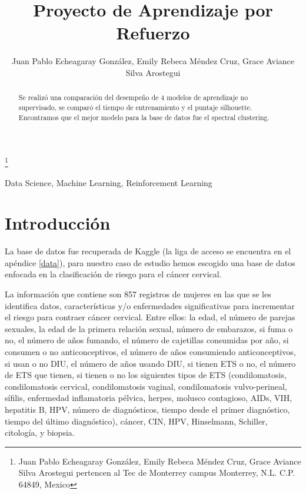 \documentclass[journal]{IEEEtran}
\title{\LARGE \bf Proyecto de Aprendizaje por Refuerzo}
\author{Juan Pablo Echeagaray González, Emily Rebeca Méndez Cruz, Grace Aviance Silva Arostegui}%
\begin{document}
    \thanks{Juan Pablo Echeagaray González, Emily Rebeca Méndez Cruz, Grace Aviance Silva Arostegui pertencen al Tec de Monterrey campus Monterrey, N.L. C.P. 64849, Mexico {\tt\small}}

    \maketitle

    \thispagestyle{empty}
    \pagestyle{empty}
    
    \begin{abstract}
        Se realizó una comparación del desempeño de 4 modelos de aprendizaje no supervisado, se comparó el tiempo de entrenamiento y el puntaje silhouette. Encontramos que el mejor modelo para la base de datos fue el spectral clustering.
    \end{abstract}

    \begin{IEEEkeywords} 
    Data Science, Machine Learning, Reinforcement Learning
    \end{IEEEkeywords}

    \section{Introducción} \label{introduction}

        La base de datos fue recuperada de Kaggle (la liga de acceso se encuentra en el apéndice \ref{data}), para nuestro caso de estudio hemos escogido una base de datos enfocada en la clasificación de riesgo para el cáncer cervical.

        La información que contiene son  857 registros de mujeres en las que se les identifica datos, características y/o enfermedades significativas para incrementar el riesgo para contraer cáncer cervical. Entre ellos: la edad, el número de parejas sexuales, la edad de la primera relación sexual, número de embarazos, si fuma o no, el número de años fumando, el número de cajetillas consumidas por año, si consumen o no anticonceptivos, el número de años consumiendo anticonceptivos, si usan o no DIU, el número de años usando DIU, si tienen ETS o no, el número de ETS que tienen, si tienen o no los siguientes tipos de ETS (condilomatosis, condilomatosis cervical, condilomatosis vaginal, condilomatosis vulvo-perineal, sífilis, enfermedad inflamatoria pélvica, herpes, molusco contagioso, AIDs, VIH, hepatitis B, HPV, número de diagnósticos, tiempo desde el primer diagnóstico, tiempo del último diagnóstico), cáncer, CIN, HPV, Hinselmann, Schiller, citología, y biopsia.
\end{document}
